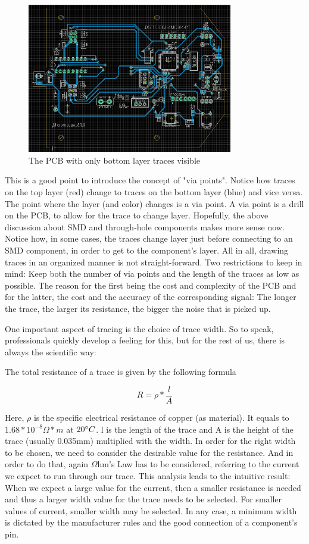 \begin{figure}[htb]
    \centering
    \includegraphics[width=0.8\textwidth]{figures/hardware/PCB_Bottom.PNG}
    \caption{The PCB with only bottom layer traces visible}
    \label{fig:bottom}
\end{figure}

\FloatBarrier
\noindent
This is a good point to introduce the concept of "via points". Notice how traces on the top layer (red) change to traces on the bottom layer (blue) and vice versa. The point where the layer (and color) changes is a via point. A via point is a drill on the PCB, to allow for the trace to change layer. 
Hopefully, the above discussion about SMD and through-hole components makes more sense now. Notice how, in some cases, the traces change layer just before connecting to an SMD component, in order to get to the component's layer.
All in all, drawing traces in an organized manner is not straight-forward. Two restrictions to keep in mind: Keep both the number of via points and the length of the traces as low as possible. The reason for the first being the cost and complexity of the PCB and for the latter, the cost and the accuracy of the corresponding signal: The longer the trace, the larger its resistance, the bigger the noise that is picked up.

One important aspect of tracing is the choice of trace width. So to speak, professionals quickly develop a feeling for this, but for the rest of us, there is always the scientific way:

The total resistance of a trace is given by the following formula

$$R = \rho * \frac{l}{A}$$

Here, $\rho$ is the specific electrical resistance of copper (as material). It equals to $1.68*10^{-8} \Omega *m$ at $20 \degree C$.
l is the length of the trace and A is the height of the trace (usually 0.035mm) multiplied with the width.
In order for the right width to be chosen, we need to consider the desirable value for the resistance. And in order to do that, again $\Omega$hm's Law has to be considered, referring to the current we expect to run through our trace.
This analysis leads to the intuitive result: When we expect a large value for the current, then a smaller resistance is needed and thus a larger width value for the trace needs to be selected. For smaller values of current, smaller width may be selected. In any case, a minimum width is dictated by the manufacturer rules and the good connection of a component's pin.

